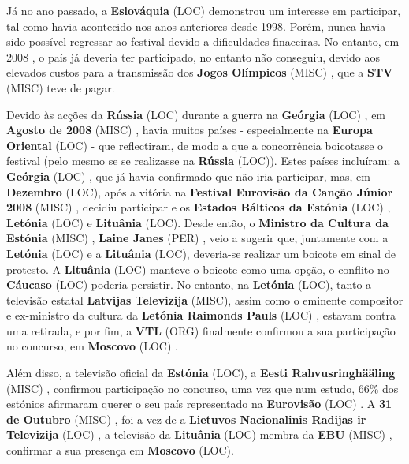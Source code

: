 \documentclass[12pt,a4paper]{article}
\begin{document}
Já no ano passado, a \textbf{Eslováquia} (LOC) demonstrou um interesse em participar, tal como havia acontecido nos anos anteriores desde 1998. Porém, nunca havia sido possível regressar ao festival devido a dificuldades finaceiras. No entanto, em 2008 , o país já deveria ter participado, no entanto não conseguiu, devido aos elevados custos para a transmissão dos \textbf{Jogos Olímpicos} (MISC) , que a \textbf{STV} (MISC) teve de pagar.

Devido às acções da \textbf{Rússia} (LOC) durante a guerra na \textbf{Geórgia} (LOC) , em \textbf{Agosto de 2008} (MISC) , havia muitos países - especialmente na \textbf{Europa Oriental} (LOC) - que reflectiram, de modo a que a concorrência boicotasse o festival (pelo mesmo se se realizasse na \textbf{Rússia} (LOC)). Estes países incluíram: a \textbf{Geórgia} (LOC) , que já havia confirmado que não iria participar, mas, em \textbf{Dezembro} (LOC), após a vitória na \textbf{Festival Eurovisão da Canção Júnior 2008} (MISC) , decidiu participar e os \textbf{Estados Bálticos da Estónia} (LOC) , \textbf{Letónia} (LOC) e \textbf{Lituânia} (LOC). Desde então, o \textbf{Ministro da Cultura da Estónia} (MISC) , \textbf{Laine Janes} (PER) , veio a sugerir que, juntamente com a \textbf{Letónia} (LOC) e a \textbf{Lituânia} (LOC), deveria-se realizar um boicote em sinal de protesto. A \textbf{Lituânia} (LOC) manteve o boicote como uma opção, o conflito no \textbf{Cáucaso} (LOC) poderia persistir. No entanto, na \textbf{Letónia} (LOC), tanto a televisão estatal \textbf{Latvijas Televizija} (MISC), assim como o eminente compositor e ex-ministro da cultura da \textbf{Letónia Raimonds Pauls} (LOC) , estavam contra uma retirada, e por fim, a \textbf{VTL} (ORG) finalmente confirmou a sua participação no concurso, em \textbf{Moscovo} (LOC) .

Além disso, a televisão oficial da \textbf{Estónia} (LOC), a \textbf{Eesti Rahvusringhääling} (MISC) , confirmou participação no concurso, uma vez que num estudo, 66\% dos estónios afirmaram querer o seu país representado na \textbf{Eurovisão} (LOC) . A \textbf{31 de Outubro} (MISC) , foi a vez de a \textbf{Lietuvos Nacionalinis Radijas ir Televizija} (LOC) , a televisão da \textbf{Lituânia} (LOC) membra da \textbf{EBU} (MISC) , confirmar a sua presença em \textbf{Moscovo} (LOC).
\end{document}
